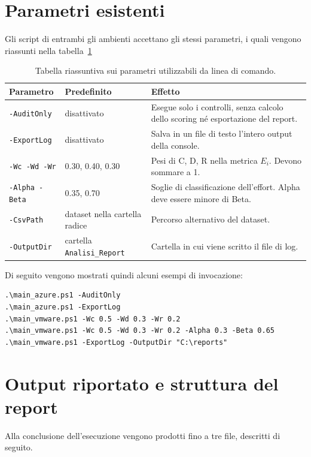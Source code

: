 \documentclass[a4paper,11pt]{report}
\begin{document}
\section{Parametri esistenti}

Gli script di entrambi gli ambienti accettano gli stessi parametri, i quali vengono riassunti nella tabella~\ref{tab:parametri}

\begin{table}[H]
\centering
\small
\begin{tabular}{p{2.3cm}p{3.1cm}p{6.2cm}}
\hline
\textbf{Parametro} & \textbf{Predefinito} & \textbf{Effetto} \\
\hline
\texttt{-AuditOnly} & disattivato & Esegue solo i controlli, senza calcolo dello scoring né esportazione del report. \\ \hline
\texttt{-ExportLog} & disattivato & Salva in un file di testo l'intero output della console. \\ \hline
\texttt{-Wc -Wd -Wr} & 0.30, 0.40, 0.30 & Pesi di C, D, R nella metrica $E_i$. Devono sommare a 1. \\ \hline
\texttt{-Alpha -Beta} & 0.35, 0.70 & Soglie di classificazione dell'effort. Alpha deve essere minore di Beta. \\ \hline
\texttt{-CsvPath} & dataset nella cartella radice & Percorso alternativo del dataset. \\ \hline
\texttt{-OutputDir} & cartella \texttt{Analisi\_Report} & Cartella in cui viene scritto il file di log. \\
\hline
\end{tabular}
\caption{Tabella riassuntiva sui parametri utilizzabili da linea di comando.}
\label{tab:parametri}
\end{table}

Di seguito vengono mostrati quindi alcuni esempi di invocazione:

\begin{lstlisting}[style=azcli]
.\main_azure.ps1 -AuditOnly
.\main_azure.ps1 -ExportLog
.\main_vmware.ps1 -Wc 0.5 -Wd 0.3 -Wr 0.2
.\main_vmware.ps1 -Wc 0.5 -Wd 0.3 -Wr 0.2 -Alpha 0.3 -Beta 0.65
.\main_vmware.ps1 -ExportLog -OutputDir "C:\reports"
\end{lstlisting}

\section{Output riportato e struttura del report}
\label{sec:file}

Alla conclusione dell'esecuzione vengono prodotti fino a tre file, descritti di seguito.
\end{document}
